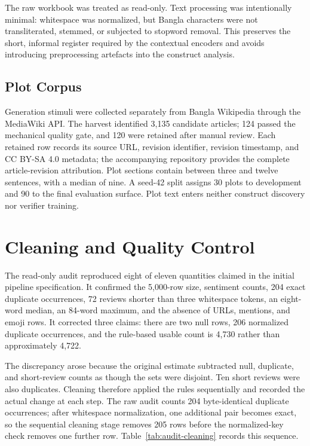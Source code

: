 The raw workbook was treated as read-only. Text processing was intentionally minimal: whitespace was normalized, but Bangla characters were not transliterated, stemmed, or subjected to stopword removal. This preserves the short, informal register required by the contextual encoders and avoids introducing preprocessing artefacts into the construct analysis.

\subsection{Plot Corpus}
\label{subsec:ch3-plot-corpus}

Generation stimuli were collected separately from Bangla Wikipedia through the MediaWiki API. The harvest identified 3,135 candidate articles; 124 passed the mechanical quality gate, and 120 were retained after manual review. Each retained row records its source URL, revision identifier, revision timestamp, and CC BY-SA 4.0 metadata; the accompanying repository provides the complete article-revision attribution. Plot sections contain between three and twelve sentences, with a median of nine. A seed-42 split assigns 30 plots to development and 90 to the final evaluation surface. Plot text enters neither construct discovery nor verifier training.

\section{Cleaning and Quality Control}
\label{sec:ch3-data-preparation-quality-control}

The read-only audit reproduced eight of eleven quantities claimed in the initial pipeline specification. It confirmed the 5,000-row size, sentiment counts, 204 exact duplicate occurrences, 72 reviews shorter than three whitespace tokens, an eight-word median, an 84-word maximum, and the absence of URLs, mentions, and emoji rows. It corrected three claims: there are two null rows, 206 normalized duplicate occurrences, and the rule-based usable count is 4,730 rather than approximately 4,722.

The discrepancy arose because the original estimate subtracted null, duplicate, and short-review counts as though the sets were disjoint. Ten short reviews were also duplicates. Cleaning therefore applied the rules sequentially and recorded the actual change at each step. The raw audit counts 204 byte-identical duplicate occurrences; after whitespace normalization, one additional pair becomes exact, so the sequential cleaning stage removes 205 rows before the normalized-key check removes one further row. Table~\ref{tab:audit-cleaning} records this sequence.

